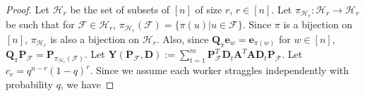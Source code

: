 \documentclass[journal,draftcls,onecolumn]{IEEEtran}
\theoremstyle{mystyle}
\newcommand{\bfD}{\mathbf{D}}
\newcommand{\bfQ}{\mathbf{Q}}
\newcommand{\bfA}{\mathbf{A}}
\newcommand{\bfP}{\mathbf{P}}
\newcommand{\cF}{\mathcal{F}}
\newcommand{\sifat}[1]{\marginpar{+}{\bf Sifat's remark}: {\em #1}}
\begin{document}
\begin{proof}











Let $\mathcal{H}_r$ be the set of subsets of $[n]$ of size $r$, $r \in [n]$. Let $\pi_{\mathcal{H}_r}: \mathcal{H}_r \to \mathcal{H}_r$ be such that for $\cF \in \mathcal{H}_r$, $\pi_{\mathcal{H}_r}(\mathcal{F}) = \{\pi(u)| u \in \cF\}$. Since $\pi$ is a bijection on $[n]$, $\pi_{\mathcal{H}_r}$ is also a bijection on $\mathcal{H}_r$. Also, since $\bfQ_{\pi} \mathbf{e}_w = \mathbf{e}_{\pi(w)}$ for $w \in [n]$, $\bfQ_{\pi} \bfP_{\cF} = \bfP_{\pi_{\mathcal{H}_r}(\cF)}$. Let $\mathbf{Y}(\bfP_{\cF}, \bfD) := \sum_{t=1}^m 
\mathbf{P}_{\cF}^T \mathbf{D}_t \mathbf{A}^T\mathbf{A}\mathbf{D}_t \mathbf{P}_{\cF}$. Let $c_r = q^{n-r} (1-q)^{r}$. Since we assume each worker straggles independently with probability $q$, we have



\end{proof}
\end{document}
